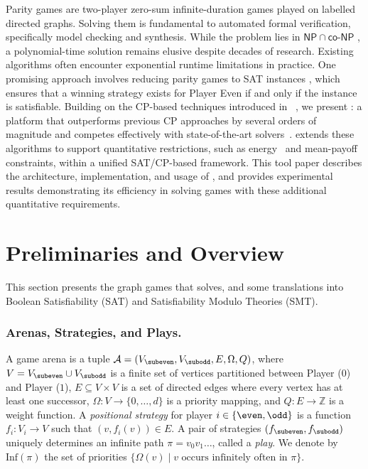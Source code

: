\documentclass[a4paper,UKenglish,cleveref, autoref, thm-restate, anonymous]{lipics-v2021}
\begin{document}
Parity games are two-player zero-sum infinite-duration games played on labelled directed graphs. Solving them is fundamental to automated formal verification, specifically model checking and synthesis. While the problem lies in $\mathsf{NP} \cap \mathsf{co\textit{-}NP}$ , a polynomial-time solution remains elusive despite decades of research. Existing algorithms often encounter exponential runtime limitations in practice. One promising approach involves reducing parity games to SAT instances , which ensures that a winning strategy exists for Player Even if and only if the instance is satisfiable.  Building on the CP-based techniques introduced in~\cite{Hernandez:2026:noc} , we present \nocq: a platform that outperforms previous CP approaches by several orders of magnitude and competes effectively with state-of-the-art solvers~\cite{vanDijk:2018,Benerecetti:2025,Aggarwal:2023}. \nocq extends these algorithms to support quantitative restrictions, such as energy~\cite{ChatterjeeD12} and mean-payoff~\cite{ChatterjeeHS17} constraints, within a unified SAT/CP-based framework. This tool paper describes the architecture, implementation, and usage of \nocq, and provides experimental results demonstrating its efficiency in solving games with these additional quantitative requirements. 

\section{Preliminaries and Overview}

This section presents the graph games that \nocq solves, and some translations into Boolean Satisfiability (SAT) and Satisfiability Modulo Theories (SMT).

\subsubsection{Arenas, Strategies, and Plays.}

A game arena is a tuple $\mathcal{A} = (V_{\subeven}, V_{\subodd}, E, \Omega, Q)$, where $V = V_{\subeven} \cup V_{\subodd}$ is a finite set of vertices partitioned between Player \even ($0$) and Player \odd ($1$), $E \subseteq V \times V$ is a set of directed edges where every vertex has at least one successor, $\Omega: V \to \{0, \dots, d\}$ is a priority mapping, and $Q: E \to \mathbb{Z}$ is a weight function.
%
A \textit{positional strategy} for player $i \in \{\even, \odd\}$ is a function $f_{i} : V_{i} \to V$ such that $(v, f_i(v)) \in E$. A pair of strategies $(f_{\subeven}, f_{\subodd})$ uniquely determines an infinite path $\pi = v_0 v_1 \dots$, called a \textit{play}. We denote by $\text{Inf}(\pi)$ the set of priorities $\{\Omega(v) \mid v \text{ occurs infinitely often in } \pi\}$.
\end{document}
